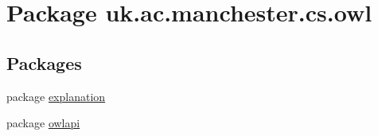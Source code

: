 \hypertarget{namespaceuk_1_1ac_1_1manchester_1_1cs_1_1owl}{\section{Package uk.\-ac.\-manchester.\-cs.\-owl}
\label{namespaceuk_1_1ac_1_1manchester_1_1cs_1_1owl}
}
\subsection*{Packages}
\begin{DoxyCompactItemize}
\item 
package \hyperlink{namespaceuk_1_1ac_1_1manchester_1_1cs_1_1owl_1_1explanation}{explanation}
\item 
package \hyperlink{namespaceuk_1_1ac_1_1manchester_1_1cs_1_1owl_1_1owlapi}{owlapi}
\end{DoxyCompactItemize}
